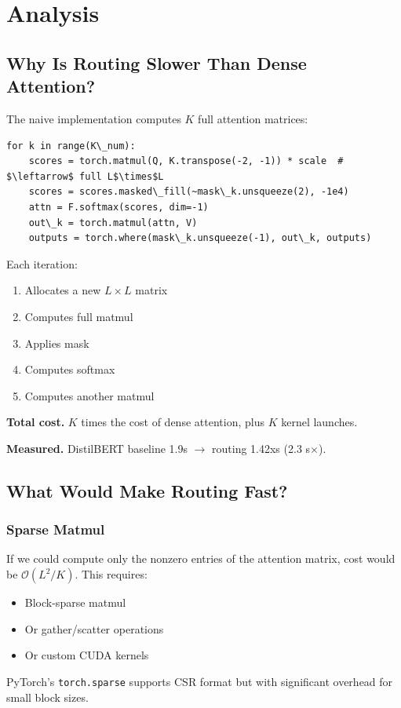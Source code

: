 
\section{Analysis}

\subsection{Why Is Routing Slower Than Dense Attention?}

The naive implementation computes $K$ full attention matrices:

\begin{lstlisting}
for k in range(K\_num):
    scores = torch.matmul(Q, K.transpose(-2, -1)) * scale  # $\leftarrow$ full L$\times$L
    scores = scores.masked\_fill(~mask\_k.unsqueeze(2), -1e4)
    attn = F.softmax(scores, dim=-1)
    out\_k = torch.matmul(attn, V)
    outputs = torch.where(mask\_k.unsqueeze(-1), out\_k, outputs)
\end{lstlisting}

Each iteration:
\begin{enumerate}
\item Allocates a new $L \times L$ matrix
\item Computes full matmul
\item Applies mask
\item Computes softmax
\item Computes another matmul

\end{enumerate}
\textbf{Total cost.} $K$ times the cost of dense attention, plus $K$ kernel launches.

\textbf{Measured.} DistilBERT baseline 1.9s $\to$ routing 1.42xs (2.3 s$\times$).

\subsection{What Would Make Routing Fast?}

\subsubsection{Sparse Matmul}

If we could compute only the nonzero entries of the attention matrix, cost 
would be $\mathcal{O}(L^2/K)$. This requires:

\begin{itemize}
\item Block-sparse matmul
\item Or gather/scatter operations
\item Or custom CUDA kernels

\end{itemize}
PyTorch's \texttt{torch.sparse} supports CSR format but with significant overhead 
for small block sizes.

